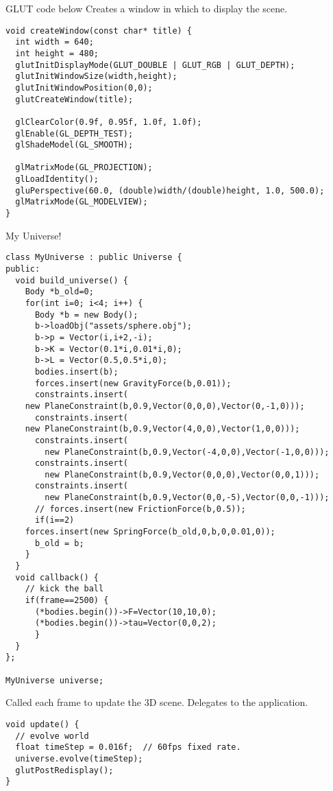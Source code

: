 GLUT code below
Creates a window in which to display the scene.
\begin{lstlisting}
void createWindow(const char* title) {
  int width = 640;
  int height = 480;
  glutInitDisplayMode(GLUT_DOUBLE | GLUT_RGB | GLUT_DEPTH);
  glutInitWindowSize(width,height);
  glutInitWindowPosition(0,0);
  glutCreateWindow(title);
  
  glClearColor(0.9f, 0.95f, 1.0f, 1.0f);
  glEnable(GL_DEPTH_TEST);
  glShadeModel(GL_SMOOTH);
  
  glMatrixMode(GL_PROJECTION);
  glLoadIdentity();
  gluPerspective(60.0, (double)width/(double)height, 1.0, 500.0);
  glMatrixMode(GL_MODELVIEW);
}
\end{lstlisting}

My Universe!
\begin{lstlisting}
class MyUniverse : public Universe {
public:
  void build_universe() {
    Body *b_old=0;
    for(int i=0; i<4; i++) {
      Body *b = new Body();
      b->loadObj("assets/sphere.obj");
      b->p = Vector(i,i+2,-i);
      b->K = Vector(0.1*i,0.01*i,0);
      b->L = Vector(0.5,0.5*i,0);
      bodies.insert(b);
      forces.insert(new GravityForce(b,0.01));
      constraints.insert(
	new PlaneConstraint(b,0.9,Vector(0,0,0),Vector(0,-1,0)));
      constraints.insert(
	new PlaneConstraint(b,0.9,Vector(4,0,0),Vector(1,0,0)));
      constraints.insert(
        new PlaneConstraint(b,0.9,Vector(-4,0,0),Vector(-1,0,0)));
      constraints.insert(
        new PlaneConstraint(b,0.9,Vector(0,0,0),Vector(0,0,1)));
      constraints.insert(
        new PlaneConstraint(b,0.9,Vector(0,0,-5),Vector(0,0,-1)));
      // forces.insert(new FrictionForce(b,0.5));
      if(i==2)
	forces.insert(new SpringForce(b_old,0,b,0,0.01,0));
      b_old = b;
    }
  }
  void callback() {
    // kick the ball
    if(frame==2500) {
      (*bodies.begin())->F=Vector(10,10,0);
      (*bodies.begin())->tau=Vector(0,0,2);
      }
  }
};

MyUniverse universe;
\end{lstlisting}

Called each frame to update the 3D scene. Delegates to
the application.
\begin{lstlisting}
void update() {
  // evolve world
  float timeStep = 0.016f;	// 60fps fixed rate.
  universe.evolve(timeStep);
  glutPostRedisplay();
}
\end{lstlisting}

